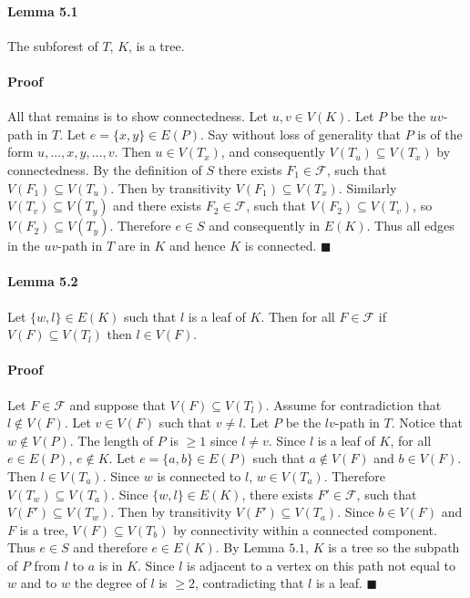 \documentclass[letterpaper,12pt,oneside,onecolumn]{report}
\begin{document}
\paragraph{Lemma 5.1}
The subforest of $T$, $K$, is a tree.
\paragraph{Proof}
All that remains is to show connectedness. Let $u,v \in V(K)$. Let $P$ be the $uv$-path in $T$. Let $e=\{x,y\} \in E(P)$. Say without loss of generality that $P$ is of the form $u,\dots,x,y,\dots,v$. Then $u \in V(T_x)$, and consequently $V(T_u) \subseteq V(T_x)$ by connectedness. By the definition of $S$ there exists $F_1 \in \mathcal{F}$, such that $V(F_1) \subseteq V(T_u)$. Then by transitivity $V(F_1) \subseteq V(T_x)$. Similarly $V(T_v) \subseteq V(T_y)$ and there exists $F_2 \in \mathcal{F}$, such that $V(F_2) \subseteq V(T_v)$, so $V(F_2) \subseteq V(T_y)$. Therefore $e \in S$ and consequently in $E(K)$. Thus all edges in the $uv$-path in $T$ are in $K$ and hence $K$ is connected. $\blacksquare$
\paragraph{Lemma 5.2}
Let $\{w, l\} \in E(K)$ such that $l$ is a leaf of $K$. Then for all $F \in \mathcal{F}$ if $V(F) \subseteq V(T_l)$ then $l \in V(F)$.
\paragraph{Proof}
Let $F \in \mathcal{F}$ and suppose that $V(F) \subseteq V(T_l)$. Assume for contradiction that $l \not\in V(F)$. Let $v \in V(F)$ such that $v \neq l$. Let $P$ be the $lv$-path in $T$. Notice that $w \not\in V(P)$. The length of $P$ is $\geq 1$ since $l \neq v$. Since $l$ is a leaf of $K$, for all $e \in E(P)$, $e \not\in K$. Let $e = \{a,b\} \in E(P)$ such that $a \not\in V(F)$ and $b \in V(F)$. Then $l \in V(T_a)$. Since $w$ is connected to $l$, $w \in V(T_a)$. Therefore $V(T_w) \subseteq V(T_a)$. Since $\{w, l\} \in E(K)$, there exists $F' \in \mathcal{F}$, such that $V(F') \subseteq V(T_w)$. Then by transitivity $V(F') \subseteq V(T_a)$. Since $b \in V(F)$ and $F$ is a tree, $V(F) \subseteq V(T_b)$ by connectivity within a connected component. Thus $e \in S$ and therefore $e \in E(K)$. By Lemma $5.1$, $K$ is a tree so the subpath of $P$ from $l$ to $a$ is in $K$. Since $l$ is adjacent to a vertex on this path not equal to $w$ and to $w$ the degree of $l$ is $\geq 2$, contradicting that $l$ is a leaf. $\blacksquare$
\end{document}
